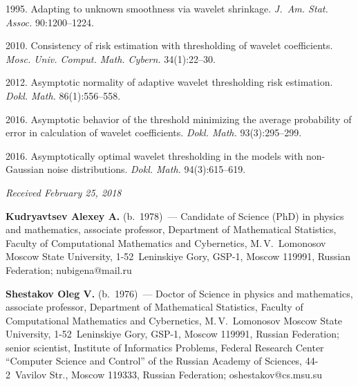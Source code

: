 \begin{multicols}{2}
{{\begin{thebibliography}{99}
 1995. Adapting to unknown smoothness via wavelet 
shrinkage.  \textit{J.~Am. Stat. Assoc.} 90:1200--1224.

 2010. Consistency of risk 
estimation with thresholding of wavelet coefficients. 
\textit{Mosc. Univ. Comput. Math. Cybern.} 34(1):22--30.

 2012. Asymptotic normality of adaptive wavelet
 thresholding risk estimation. \textit{Dokl. Math.} 86(1):556--558.

 2016. 
Asymptotic behavior of the threshold minimizing the average 
probability of error in calculation of wavelet coefficients. 
\textit{Dokl. Math.} 93(3):295--299.

 2016. 
Asymptotically optimal wavelet thresholding in the models with 
non-Gaussian noise distributions. \textit{Dokl. Math.} 94(3):615--619.
\end{thebibliography}

 }
 }

\end{multicols}

\vspace*{-3pt}

\hfill{\small\textit{Received February 25, 2018}}




\Contr

\noindent
\textbf{Kudryavtsev Alexey A.} (b.\ 1978)~--- 
Candidate of Science (PhD) in physics and mathematics, associate professor, 
Department of Mathematical Statistics, Faculty of Computational 
Mathematics and Cybernetics, M.\,V.~Lomonosov Moscow State University, 
1-52~Leninskiye Gory, GSP-1, Moscow 119991, Russian Federation; \mbox{nubigena@mail.ru}

\vspace*{3pt}

\noindent
\textbf{Shestakov Oleg V.} (b.\ 1976)~--- 
Doctor of Science in physics and mathematics, associate professor, 
Department of Mathematical Statistics, Faculty of Computational Mathematics 
and Cybernetics, M.\,V.~Lomonosov Moscow State University, 1-52~Leninskiye Gory, 
GSP-1, Moscow 119991, Russian Federation; senior scientist, 
Institute of Informatics Problems, Federal Research Center 
``Computer Science and Control'' of the Russian Academy of Sciences, 
44-2~Vavilov Str., Moscow 119333, Russian Federation; \mbox{oshestakov@cs.msu.su}

\label{end\stat}


\renewcommand{\bibname}{\protect\rm Литература} 